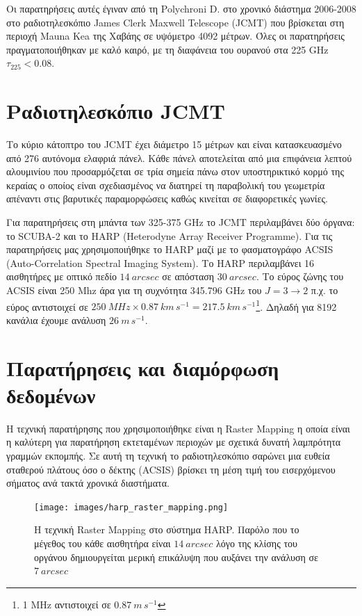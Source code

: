 \documentclass[a4paper,12pt]{memoir}
\begin{document}
Οι παρατηρήσεις αυτές έγιναν από τη Polychroni D. στο χρονικό διάστημα 2006-2008 στο ραδιοτηλεσκόπιο James Clerk Maxwell Telescope (JCMT) που βρίσκεται στη περιοχή Mauna Kea της Χαβάης σε υψόμετρο 4092 μέτρων. Όλες οι παρατηρήσεις πραγματοποιήθηκαν με καλό καιρό, με τη διαφάνεια του ουρανού στα 225 GHz $\tau _{225} <0.08$.

\bigskip

\section{Ραδιοτηλεσκόπιο JCMT}

Το κύριο κάτοπτρο του JCMT έχει διάμετρο 15 μέτρων και είναι κατασκευασμένο από 276 αυτόνομα ελαφριά πάνελ. Κάθε πάνελ αποτελείται από μια επιφάνεια λεπτού αλουμινίου που προσαρμόζεται σε τρία σημεία πάνω στον υποστηρικτικό κορμό της κεραίας ο οποίος είναι σχεδιασμένος να διατηρεί τη παραβολική του γεωμετρία απέναντι στις βαρυτικές παραμορφώσεις καθώς κινείται σε διαφορετικές γωνίες.

Για παρατηρήσεις στη μπάντα των 325-375 GHz το JCMT περιλαμβάνει δύο όργανα: το SCUBA-2 και το HARP (Heterodyne Array Receiver Programme). Για τις παρατηρήσεις μας χρησιμοποιήθηκε το  HARP μαζί με το φασματογράφο ACSIS (Auto-Correlation Spectral Imaging System). Το HARP περιλαμβάνει 16 αισθητήρες με οπτικό πεδίο $14 \ arcsec$ σε απόσταση $30 \ arcsec$. Το εύρος ζώνης του ACSIS είναι 250 Mhz άρα για τη συχνότητα 345.796 GHz του  $J=3\to 2$ π.χ. το εύρος αντιστοιχεί σε $250\ MHz \times 0.87\ km\,s^{-1} = 217.5\ km\,s^{-1}$\footnote{1 MHz αντιστοιχεί σε $0.87\  m\,s^{-1}$}. Δηλαδή για 8192 κανάλια έχουμε ανάλυση $26\ m\,s^{-1}$. 

\section{Παρατήρησεις και διαμόρφωση δεδομένων}
Η τεχνική παρατήρησης που χρησιμοποιήθηκε είναι η Raster Mapping η οποία είναι η καλύτερη για παρατήρηση εκτεταμένων περιοχών με σχετικά δυνατή λαμπρότητα γραμμών εκπομπής. Σε αυτή τη τεχνική το ραδιοτηλεσκόπιο σαρώνει μια ευθεία σταθερού πλάτους όσο ο δέκτης (ACSIS) βρίσκει τη μέση τιμή του εισερχόμενου σήματος ανά τακτά χρονικά διαστήματα. 


\begin{figure}[h]
	\centering
	\texttt{[image: images/harp\_raster\_mapping.png]}
	\caption{Η τεχνική Raster Mapping στο σύστημα HARP. Παρόλο που το μέγεθος του κάθε αισθητήρα είναι $14\ arcsec$ λόγο της κλίσης του οργάνου δημιουργείται μερική επικάλυψη που αυξάνει την ανάλυση σε $7\ arcsec$ }
\end{figure}
\end{document}
